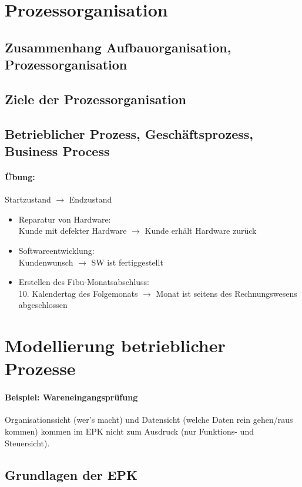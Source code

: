 \section{Prozessorganisation}
\subsection{Zusammenhang Aufbauorganisation, Prozessorganisation}
\subsection{Ziele der Prozessorganisation}
\subsection{Betrieblicher Prozess, Geschäftsprozess, Business Process}
\paragraph{Übung:}
Startzustand $\to$ Endzustand
\begin{itemize}
\item Reparatur von Hardware:\\
Kunde mit defekter Hardware $\to$ Kunde erhält Hardware zurück
\item Softwareentwicklung:\\
Kundenwunsch $\to$ SW ist fertiggestellt
\item Erstellen des Fibu-Monatsabschluss:\\
10. Kalendertag des Folgemonats $\to$ Monat ist seitens des Rechnungswesens abgeschlossen
\end{itemize}

\section{Modellierung betrieblicher Prozesse}
\paragraph{Beispiel: Wareneingangsprüfung}
Organisationssicht (wer's macht) und Datensicht (welche Daten rein gehen/raus kommen) kommen im EPK nicht zum Ausdruck (nur Funktions- und Steuersicht).
\subsection{Grundlagen der EPK}
